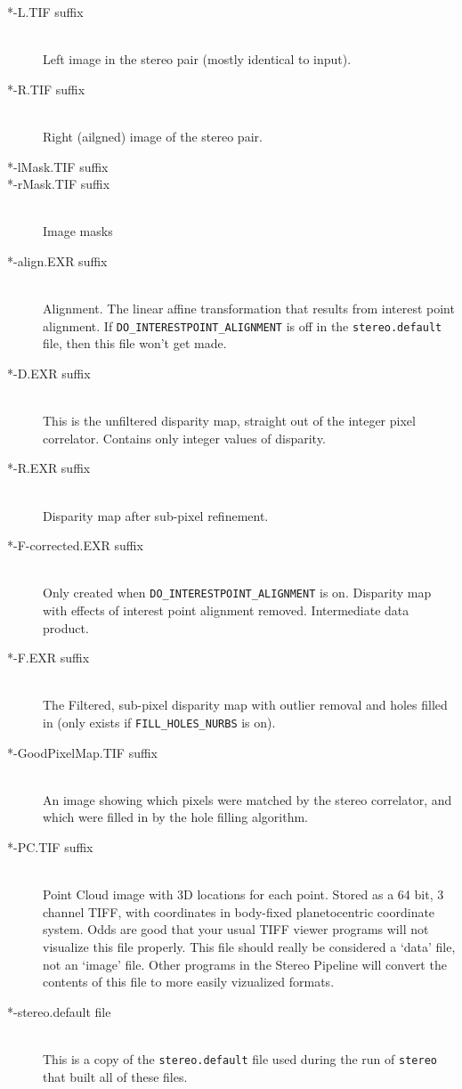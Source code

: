 \begin{description}
\item[*-L.TIF suffix] \hfill \\
  Left image in the stereo pair (mostly identical to input).

\item[*-R.TIF suffix] \hfill \\
  Right (ailgned) image of the stereo pair.

\item[*-lMask.TIF suffix]
\item[*-rMask.TIF suffix] \hfill \\
  Image masks

\item[*-align.EXR suffix] \hfill \\
  Alignment.  The linear affine transformation that
  results from interest point alignment.  If
  \texttt{DO\_INTERESTPOINT\_ALIGNMENT} is off in the
  \texttt{stereo.default} file, then this file won't get made.

\item[*-D.EXR suffix] \hfill \\
  This is the unfiltered disparity map, straight
  out of the integer pixel correlator.  Contains only integer values
  of disparity.

\item[*-R.EXR suffix] \hfill \\
  Disparity map after sub-pixel refinement.

\item[*-F-corrected.EXR suffix] \hfill \\
  Only created when \texttt{DO\_INTERESTPOINT\_ALIGNMENT} is on.
  Disparity map with effects of interest point alignment removed.
  Intermediate data product.

\item[*-F.EXR suffix] \hfill \\
  The Filtered, sub-pixel disparity map with outlier removal and holes
  filled in (only exists if \texttt{FILL\_HOLES\_NURBS} is on).

\item[*-GoodPixelMap.TIF suffix] \hfill \\
  An image showing which pixels were matched by the stereo correlator,
  and which were filled in by the hole filling algorithm.

\item[*-PC.TIF suffix] \hfill \\
  Point Cloud image with 3D locations for each point.  Stored as a
  64 bit, 3 channel TIFF, with coordinates in body-fixed planetocentric
  coordinate system.  Odds are good that your usual TIFF viewer
  programs will not visualize this file properly.  This file should
  really be considered a `data' file, not an `image' file.  Other
  programs in the Stereo Pipeline will convert the contents of this
  file to more easily vizualized formats.

\item[*-stereo.default file] \hfill \\
  This is a copy of the \texttt{stereo.default} file
  used during the run of \texttt{stereo} that built all of these
  files.

\end{description}

